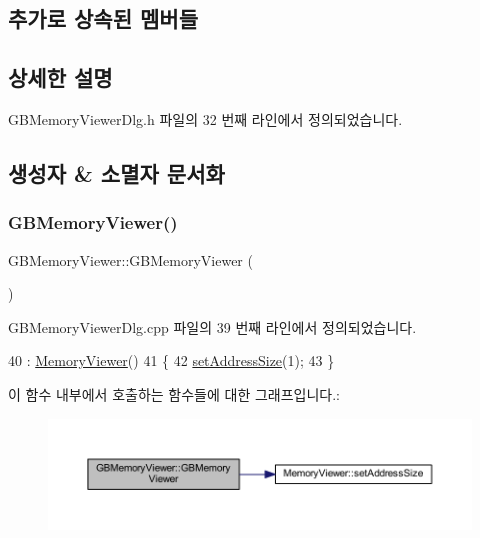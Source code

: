 \subsection*{추가로 상속된 멤버들}


\subsection{상세한 설명}


G\+B\+Memory\+Viewer\+Dlg.\+h 파일의 32 번째 라인에서 정의되었습니다.



\subsection{생성자 \& 소멸자 문서화}
\mbox{\label{class_g_b_memory_viewer_a5a01f4c525ddefc77be187179f7358f1}} 
\subsubsection{\texorpdfstring{G\+B\+Memory\+Viewer()}{GBMemoryViewer()}}
{\footnotesize\ttfamily G\+B\+Memory\+Viewer\+::\+G\+B\+Memory\+Viewer (\begin{DoxyParamCaption}{ }\end{DoxyParamCaption})}



G\+B\+Memory\+Viewer\+Dlg.\+cpp 파일의 39 번째 라인에서 정의되었습니다.


\begin{DoxyCode}
40   : \mbox{\hyperlink{class_memory_viewer_abb2fe8dcb2bfbf02b714dacc3d46cc55}{MemoryViewer}}()
41 \{
42   \mbox{\hyperlink{class_memory_viewer_a64938573e15f4d5b31eea26dc6788d0e}{setAddressSize}}(1);
43 \}
\end{DoxyCode}
이 함수 내부에서 호출하는 함수들에 대한 그래프입니다.\+:
\nopagebreak
\begin{figure}[H]
\begin{center}
\leavevmode
\includegraphics[width=350pt]{class_g_b_memory_viewer_a5a01f4c525ddefc77be187179f7358f1_cgraph}
\end{center}
\end{figure}


